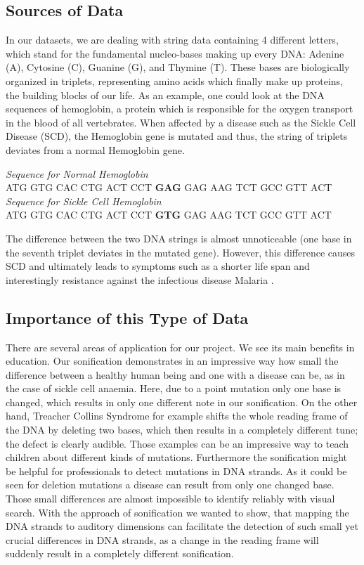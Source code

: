 \documentclass[10pt]{article}
\begin{document}
\subsection{Sources of Data}
In our datasets, we are dealing with string data containing 4 different letters, which 
stand for the fundamental nucleo-bases making up every DNA: Adenine (A), Cytosine (C), 
Guanine (G), and Thymine (T). These bases are biologically organized in triplets, 
representing amino acids which finally make up proteins, the building blocks of our life. As 
an example, one could look at the DNA sequences of hemoglobin, a protein which is 
responsible for the oxygen transport in the blood of all vertebrates. When affected by a 
disease such as the Sickle Cell Disease (SCD), the Hemoglobin gene is mutated and thus, the 
string of triplets deviates from a normal Hemoglobin gene.


\begin{center}
  \emph{Sequence for Normal Hemoglobin}\\
  ATG GTG CAC CTG ACT CCT \textbf{GAG} GAG AAG TCT GCC GTT ACT\\
  \emph{Sequence for Sickle Cell Hemoglobin}\\
  ATG GTG CAC CTG ACT CCT \textbf{GTG} GAG AAG TCT GCC GTT ACT\\
\end{center}

The difference between the two DNA strings is almost unnoticeable (one base in the 
seventh triplet deviates in the mutated gene). However, this difference causes SCD and 
ultimately leads to symptoms such as a shorter life span \cite{more_sickles} and interestingly 
resistance against the infectious disease Malaria \cite{sickle_cells}.
\subsection{Importance of this Type of Data}
There are several areas of application for our project. We see its main benefits in education. 
Our sonification demonstrates in an impressive way how small the difference between a 
healthy human being and one with a disease can be, as in the case of sickle cell anaemia. 
Here, due to a point mutation only one base is changed, which results in only one different 
note in our sonification. On the other hand, Treacher Collins Syndrome for example shifts the 
whole reading frame of the DNA by deleting two bases, which then results in a completely 
different tune; the defect is clearly audible. Those examples can be an impressive way to 
teach children about different kinds of mutations. Furthermore the sonification might be 
helpful for professionals to detect mutations in DNA strands. As it could be seen for deletion 
mutations a disease can result from only one changed base. Those small differences are 
almost impossible to identify reliably with visual search. With the approach of sonification 
we wanted to show, that mapping the DNA strands to auditory dimensions can facilitate the 
detection of such small yet crucial differences in DNA strands, as a change in the reading 
frame will suddenly result in a completely different sonification. 
\end{document}
